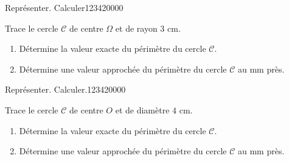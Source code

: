 \begin{pageAD} 

 
  
\begin{ExoCad}{Représenter. Calculer}{1234}{2}{0}{0}{0}{0}

\begin{minipage}{.38\linewidth}
 
Trace le cercle $\mathcal{C}$ de centre $\Omega$ et de rayon $3$ cm.



 \end{minipage}
 \hfill
 \begin{minipage}{.58\linewidth}
\begin{enumerate}
\item Détermine la valeur exacte du périmètre du cercle $\mathcal{C}$. 
\item Détermine une valeur approchée du périmètre du cercle $\mathcal{C}$ au mm près. 
 \end{enumerate}  
 \end{minipage}
 
\end{ExoCad} 
  
\begin{ExoCad}{Représenter. Calculer.}{1234}{2}{0}{0}{0}{0}

\begin{minipage}{.38\linewidth}
 
Trace le cercle $\mathcal{C}$ de centre $O$ et de diamètre $4$ cm.



 \end{minipage}
 \hfill
 \begin{minipage}{.58\linewidth}
\begin{enumerate}
\item Détermine la valeur exacte du périmètre du cercle $\mathcal{C}$. 
\item Détermine une valeur approchée du périmètre du cercle $\mathcal{C}$ au mm près. 
 \end{enumerate}  
 \end{minipage}
 

\end{ExoCad}
\end{pageAD}
